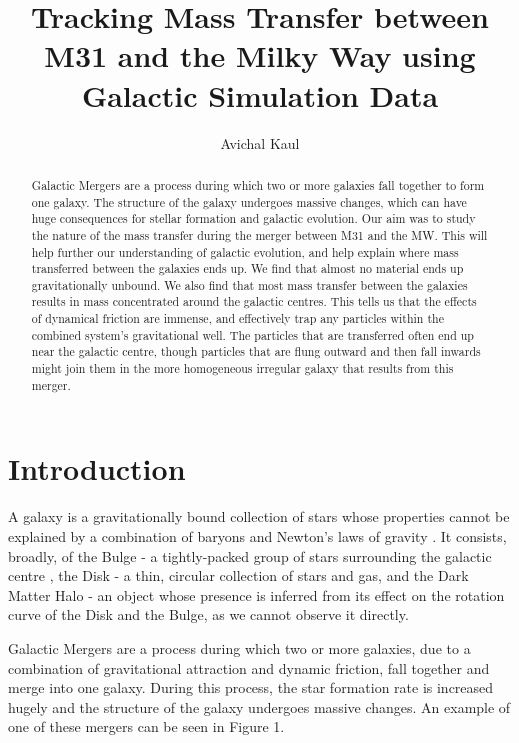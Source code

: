 \documentclass[linenumbers, ]{aastex631}
\begin{document}
\title{Tracking Mass Transfer between M31 and the Milky Way using Galactic Simulation Data}



\author{Avichal Kaul}

\begin{abstract}
Galactic Mergers are a process during which two or more galaxies fall together to form one galaxy. The structure of the galaxy undergoes massive changes, which can have huge consequences for stellar formation and galactic evolution. Our aim was to study the nature of the mass transfer during the merger between M31 and the MW. This will help further our understanding of galactic evolution, and help explain where mass transferred between the galaxies ends up. We find that almost no material ends up gravitationally unbound. We also find that most mass transfer between the galaxies results in mass concentrated around the galactic centres. This tells us that the effects of dynamical friction are immense, and effectively trap any particles within the combined system's gravitational well. The particles that are transferred often end up near the galactic centre, though particles that are flung outward and then fall inwards might join them in the more homogeneous irregular galaxy that results from this merger.
\end{abstract}


\section{Introduction}

A galaxy is a gravitationally bound collection of stars whose properties
cannot be explained by a combination of baryons and Newton’s laws of gravity \citep{Willman_Strader_2012}. It consists, broadly, of the Bulge - a tightly-packed group of stars surrounding the galactic centre \citep{Minniti_2007}, the Disk - a thin, circular collection of stars and gas, and the Dark Matter Halo - an object whose presence is inferred from its effect on the rotation curve of the Disk and the Bulge, as we cannot observe it directly.

Galactic Mergers are a process during which two or more galaxies, due to a combination of gravitational attraction and dynamic friction, fall together and merge into one galaxy. During this process, the star formation rate is increased hugely \citep{Moster_2011} and the structure of the galaxy undergoes massive changes. An example of one of these mergers can be seen in Figure 1.
\end{document}
